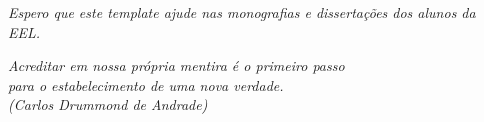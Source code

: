 \documentclass[
	12pt,				%
	openright,			%
	twoside,			%
	a4paper,			%
	english,			%
	french,				%
	spanish,			%
	brazil				%
	]{abntex2}
\begin{document}

\frenchspacing 

\imprimirfolhaderosto*


\begin{fichacatalografica}
	\sffamily
	\vspace*{\fill}					%
	\begin{center}					%
	\end{center}
\end{fichacatalografica}

\newpage
\begin{dedicatoria}
   \vspace*{\fill}
   \centering
   \noindent
   \textit{Espero que este template ajude nas monografias e dissertações dos alunos da EEL.} \vspace*{\fill}
\end{dedicatoria}

\begin{agradecimentos}
	
	

\end{agradecimentos}

\begin{epigrafe}
    \vspace*{\fill}
	\begin{flushright}
		\textit{Acreditar em nossa própria mentira é o primeiro passo\\
		para o estabelecimento de uma nova verdade.\\
    (Carlos Drummond de Andrade)	}
	\end{flushright}
\end{epigrafe}
\end{document}
